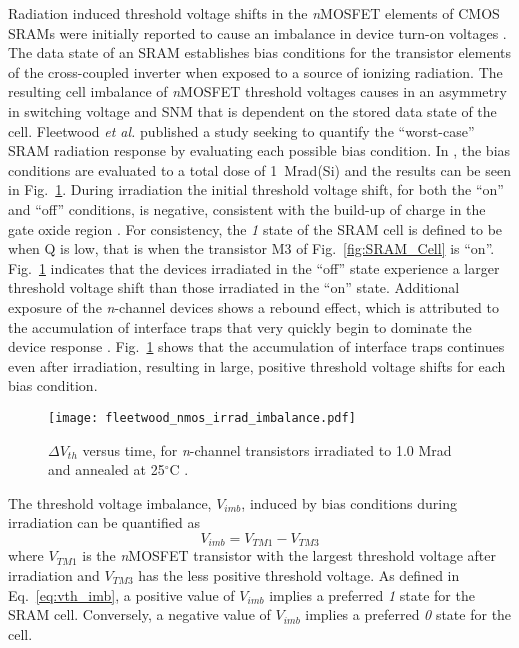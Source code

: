 Radiation induced threshold voltage shifts in the \emph{n}MOSFET elements of CMOS SRAMs were initially reported to cause an imbalance in device turn-on voltages \cite{Arimura:1985wl}.
The data state of an SRAM establishes bias conditions for the transistor elements of the cross-coupled inverter when exposed to a source of ionizing radiation. 
The resulting cell imbalance of \emph{n}MOSFET threshold voltages causes in an asymmetry in switching voltage and SNM that is dependent on the stored data state of the cell. 
Fleetwood \emph{et al.} published a study seeking to quantify the ``worst-case'' SRAM radiation response by evaluating each possible bias condition. 
In \cite{Fleetwood:1987cfa}, the bias conditions are evaluated to a total dose of 1~Mrad(Si) and the results can be seen in Fig.~\ref{fig:sram_cell_imb_nmos_vth}.
During irradiation the initial threshold voltage shift, for both the ``on'' and ``off'' conditions, is negative, consistent with the build-up of charge in the gate oxide region \cite{Dressendorfer:1981kg,Galloway:1990kh}. 
For consistency, the \emph{1} state of the SRAM cell is defined to be when Q is low, that is when the transistor M3 of Fig.~\ref{fig:SRAM_Cell} is ``on''.
Fig.~\ref{fig:sram_cell_imb_nmos_vth} indicates that the devices irradiated in the ``off'' state experience a larger threshold voltage shift than those irradiated in the ``on'' state.
Additional exposure of the \emph{n}-channel devices shows a rebound effect, which is attributed to the accumulation of interface traps that very quickly begin to dominate the device response \cite{Fleetwood:1993vs,Galloway:1990kh}. 
Fig.~\ref{fig:sram_cell_imb_nmos_vth} shows that the accumulation of interface traps continues even after irradiation, resulting in large, positive threshold voltage shifts for each bias condition.

\begin{figure}[tb]
    \begin{center}
        \texttt{[image: fleetwood\_nmos\_irrad\_imbalance.pdf]}
    \end{center}
    \caption[$\Delta V_{th}$ versus time, for \emph{n}-channel transistors irradiated to 1.0 Mrad and annealed at 25$^\circ$C.]{$\Delta V_{th}$ versus time, for \emph{n}-channel transistors irradiated to 1.0 Mrad and annealed at 25$^\circ$C \cite{Fleetwood:1987cfa}.}
    \label{fig:sram_cell_imb_nmos_vth}
\end{figure}

The threshold voltage imbalance, $V_{imb}$, induced by bias conditions during irradiation can be quantified as
\begin{equation}
    \label{eq:vth_imb}
    V_{imb} = V_{TM1} - V_{TM3}
\end{equation}
where $V_{TM1}$ is the \emph{n}MOSFET transistor with the largest threshold voltage after irradiation and $V_{TM3}$ has the less positive threshold voltage.
As defined in Eq.~\ref{eq:vth_imb}, a positive value of $V_{imb}$ implies a preferred \emph{1} state for the SRAM cell.
Conversely, a negative value of $V_{imb}$ implies a preferred \emph{0} state for the cell.

